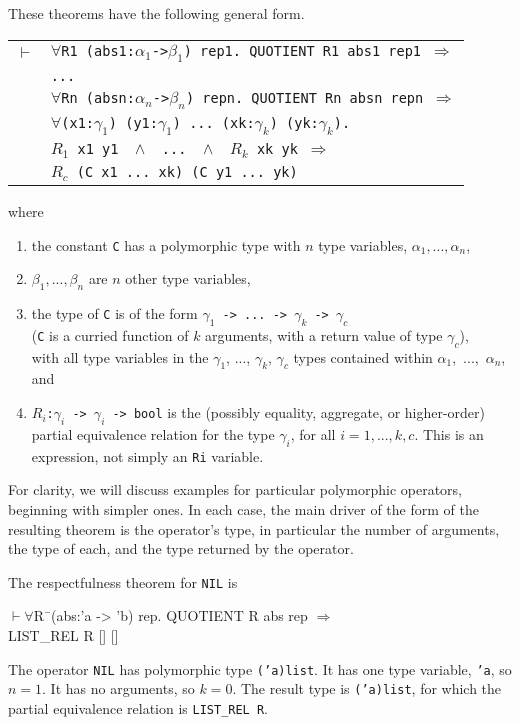\documentclass[envcountsame,runningheads]{llncs}
\newcommand{\quotient}{partial equivalence}
\begin{document}
These theorems have the following general form.
\begin{center}
\begin{tabular}{rl}
$\vdash$
& {\tt $\forall$R1 (abs1:$\alpha_1$->$\beta_1$) rep1. QUOTIENT R1 abs1 rep1 $\Rightarrow$} \\
& {\tt ...} \\
& {\tt $\forall$Rn (absn:$\alpha_n$->$\beta_n$) repn. QUOTIENT Rn absn repn $\Rightarrow$} \\
& {\tt $\forall$(x1:$\gamma_1$) (y1:$\gamma_1$) ... (xk:$\gamma_k$) (yk:$\gamma_k$).}
\\
& \hspace{12mm}
{\tt $R_1$ x1 y1 \
$\wedge$ \
... \
$\wedge$ \
$R_k$ xk yk $\Rightarrow$
}  \\
& \hspace{12mm}
{\tt $R_c$ (C x1 ... xk) (C y1 ... yk)}  \\
\end{tabular}
\end{center}
where
\begin{enumerate}
\item
the constant {\tt C} has a polymorphic type with $n$ type variables,
$\alpha_1, ..., \alpha_n$,
\item
$\beta_1, ..., \beta_n$ are $n$ other type variables,
\item
the type of {\tt C} is of the form
{\tt $\gamma_1$ -> ... -> $\gamma_k$ -> $\gamma_c$} \\
({\tt C} is a curried function of $k$ arguments, with a return value of
type $\gamma_c$), \\
with
all type variables in the $\gamma_1$, ..., $\gamma_k$, $\gamma_c$ types
contained within $\alpha_1$,~...,~$\alpha_n$,
and
\item
{\tt $R_i$:$\gamma_i$ -> $\gamma_i$ -> bool}
is the (possibly equality, aggregate, or higher-order)
\quotient{} relation
for the type $\gamma_i$, for all $i=1,...,k,c$.
This is an expression, not simply an
{\tt Ri} variable.
\end{enumerate}

For clarity, we will discuss examples for particular polymorphic
operators, beginning with simpler ones.  In each case, the main driver
of the form of the resulting theorem is the operator's type,
in particular the number of arguments, the type of each, and the type
returned by the operator.

\pagebreak[3]
The respectfulness theorem for {\tt NIL} is
{\tt \begin{tabbing}
\hspace{5.5mm}
    $\vdash \forall$R\=\ (abs:'a -> 'b) rep. QUOTIENT R abs rep $\Rightarrow$ \\
\>       LIST\_REL R [] []
\end{tabbing}}
The operator {\tt NIL} has polymorphic type {\tt ('a)list}.
It has one type variable, {\tt 'a}, so $n = 1$.
It has no arguments, so $k = 0$.
The result type is
{\tt ('a)list},
for which
the \quotient{} relation
is {\tt LIST\_REL R}.
\end{document}
